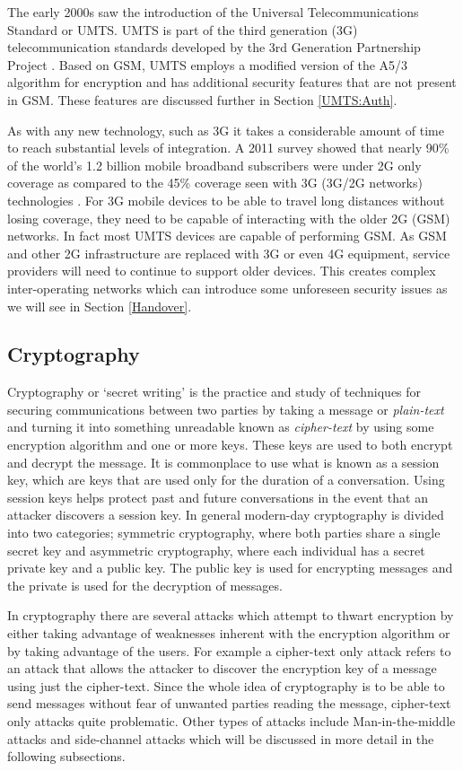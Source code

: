 \documentclass{sig-alternate}
\begin{document}
The early 2000s saw the introduction of the Universal Telecommunications Standard or UMTS. UMTS is part of the third generation (3G) telecommunication standards developed by the 3rd Generation Partnership Project \cite{wiki:UMTS}. Based on GSM, UMTS employs a modified version of the A5/3 algorithm for encryption and has additional security features  that are not present in GSM. These features are discussed further in Section \ref{UMTS:Auth}. 

 As with any new technology, such as 3G it takes a considerable amount of time to reach substantial levels of integration. A 2011 survey showed that nearly 90\% of the world's 1.2 billion mobile broadband subscribers were under 2G only coverage as compared to the 45\% coverage seen with 3G (3G/2G networks) technologies \cite{2G-coverage}. For 3G mobile devices to be able to travel long distances without losing coverage, they need to be capable of interacting with the older 2G (GSM) networks. In fact most UMTS devices are capable of performing GSM. As GSM and other 2G infrastructure are replaced with 3G or even 4G equipment, service providers will need to continue to support older devices. This creates complex inter-operating networks which can introduce some unforeseen security issues as we will see in Section \ref{Handover}.

	\subsection{Cryptography \label{crypto}}
	Cryptography or  `secret writing' is the practice and study of techniques for securing communications between two parties by taking a message or \textit{plain-text} and turning it into something  unreadable known as \textit{cipher-text} by using some encryption algorithm and one or more keys. These keys are used to both encrypt and decrypt the message. It is commonplace to use what is known as a session key, which are keys that are used only for the duration of a conversation. Using session keys helps protect past and future conversations in the event that an attacker discovers a session key. In general modern-day cryptography is divided into two categories; symmetric cryptography, where both parties share a single secret key and asymmetric cryptography, where each individual has a secret private key and a public key. The public key is used for encrypting messages and the private is used for the decryption of messages.
	
	In cryptography there are several attacks which attempt to thwart encryption by either taking advantage of weaknesses inherent with the encryption algorithm or by taking advantage of the users. For example a cipher-text only attack refers to an attack that allows the attacker to discover the encryption key of a message using just the cipher-text. Since the whole idea of cryptography is to be able to send messages without fear of unwanted parties reading the message, cipher-text only attacks quite problematic. Other types of attacks include Man-in-the-middle attacks and side-channel attacks which will be discussed in more detail in the following subsections.   
\end{document}
